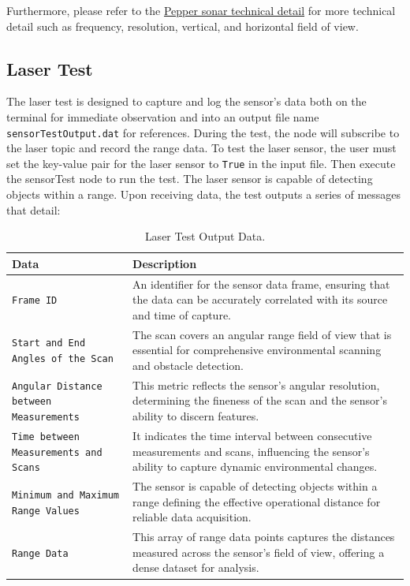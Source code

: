 \documentclass{CSSRforAfrica}
\begin{document}
Furthermore, please refer to the \href{http://doc.aldebaran.com/2-5/family/pepper_technical/sonar_pep.html#d-sonar-pepper}{Pepper sonar technical detail} for more technical detail 
such as frequency, resolution, vertical, and horizontal field of view.


\subsection{Laser Test}
The laser test is designed to capture and log the sensor's data both on the terminal for immediate observation and into an output file name \texttt{sensorTestOutput.dat} for references. 
During the test, the node will subscribe to the laser topic and record the range data. To test the laser sensor, the user must set the key-value pair for the laser sensor to \texttt{True} in the input file. 
Then execute the sensorTest node to run the test. The laser sensor is capable of detecting objects within a range. Upon receiving data, the test outputs a series of messages that detail:

\begin{longtable}[c]{|l|p{7cm}|}
	\caption{Laser Test Output Data.} \label{tab:laser_test_output}\\
	\hline
	\rowcolor{gray!30}
	\textbf{Data} & \textbf{Description} \\ \hline
	\endhead %
	\small{\texttt{Frame ID}} & \small{An identifier for the sensor data frame, ensuring that the data can be accurately correlated with its source and time of capture.} \\ \hline
	\small{\texttt{Start and End Angles of the Scan}} & \small{The scan covers an angular range field of view that is essential for comprehensive environmental scanning and obstacle detection.} \\ \hline
	\small{\texttt{Angular Distance between Measurements}} & \small{This metric reflects the sensor's angular resolution, determining the fineness of the scan and the sensor's ability to discern features.} \\ \hline
	\small{\texttt{Time between Measurements and Scans}} & \small{It indicates the time interval between consecutive measurements and scans, influencing the sensor's ability to capture dynamic environmental changes.} \\ \hline
	\small{\texttt{Minimum and Maximum Range Values}} & \small{The sensor is capable of detecting objects within a range defining the effective operational distance for reliable data acquisition.} \\ \hline
	\small{\texttt{Range Data}} & \small{This array of range data points captures the distances measured across the sensor's field of view, offering a dense dataset for analysis.} \\ \hline
\end{longtable}
\end{document}
